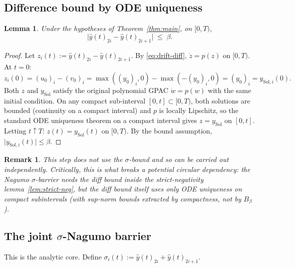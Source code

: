 \documentclass[11pt]{article}
\newtheorem{lemma}[theorem]{Lemma}
\newtheorem{remark}[theorem]{Remark}
\newcommand{\abs}[1]{\lvert #1 \rvert}
\begin{document}
\subsection{Difference bound by ODE uniqueness}

\begin{lemma}\label{lem:diff}
Under the hypotheses of Theorem~\ref{thm:main}, on $[0, T)$,
\[
  \abs{\widehat y(t)_{2i} - \widehat y(t)_{2i+1}}
    \;\le\; \beta.
\]
\end{lemma}

\begin{proof}
Let $z_i(t) := \widehat y(t)_{2i} - \widehat y(t)_{2i+1}$.  By
\eqref{eq:drift-diff}, $\dot z = p(z)$ on $[0, T)$.  At $t = 0$:
\[
  z_i(0)
    = (u_0)_i - (v_0)_i
    = \max((y_0)_i, 0) - \max(-(y_0)_i, 0)
    = (y_0)_i
    = y_{\mathrm{Sol}, i}(0).
\]
Both $z$ and $y_{\mathrm{Sol}}$ satisfy the original polynomial GPAC
$\dot w = p(w)$ with the same initial condition.  On any compact
sub-interval $[0, t] \subset [0, T)$, both solutions are bounded
(continuity on a compact interval) and $p$ is locally Lipschitz, so
the standard ODE uniqueness theorem on a compact interval gives
$z = y_{\mathrm{Sol}}$ on $[0, t]$.  Letting $t \uparrow T$:
$z(t) = y_{\mathrm{Sol}}(t)$ on $[0, T)$.  By the bound assumption,
$\abs{y_{\mathrm{Sol}, i}(t)} \le \beta$.
\end{proof}

\begin{remark}
This step does \emph{not} use the $\sigma$-bound and so can be carried
out independently.  Critically, this is what breaks a potential
circular dependency: the Nagumo $\sigma$-barrier needs the diff bound
inside the strict-negativity lemma~\ref{lem:strict-neg}, but the diff
bound itself uses only ODE uniqueness on compact subintervals (with
sup-norm bounds extracted by compactness, not by $B_\beta$).
\end{remark}

\subsection{The joint $\sigma$-Nagumo barrier}\label{sec:sigma}

This is the analytic core.  Define
$\sigma_i(t) := \widehat y(t)_{2i} + \widehat y(t)_{2i+1}$.
\end{document}
